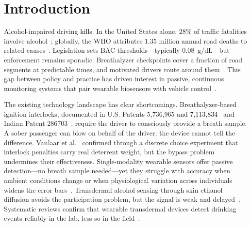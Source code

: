 \documentclass[HARVARD,Times2COL]{WileyNJDv5}
\begin{document}



\maketitle

\renewcommand\thefootnote{}

\renewcommand\thefootnote{\fnsymbol{footnote}}
\setcounter{footnote}{1}

\section{Introduction}\label{sec1}

Alcohol-impaired driving kills. In the United States alone, 28\% of traffic fatalities involve alcohol~\citep{nhtsa2022}; globally, the WHO attributes 1.35 million annual road deaths to related causes~\citep{who2018}. Legislation sets BAC thresholds---typically 0.08~g/dL---but enforcement remains sporadic. Breathalyzer checkpoints cover a fraction of road segments at predictable times, and motivated drivers route around them~\citep{das2023, lombardo2020l}. This gap between policy and practice has driven interest in passive, continuous monitoring systems that pair wearable biosensors with vehicle control~\citep{watchover}.

The existing technology landscape has clear shortcomings. Breathalyzer-based ignition interlocks, documented in U.S. Patents 5,736,965 and 7,113,834~\citep{uspat5736965, uspat7113834} and Indian Patent 286703~\citep{inpat286703}, require the driver to consciously provide a breath sample. A sober passenger can blow on behalf of the driver; the device cannot tell the difference. Vanlaar et al.~\citep{interlock2024} confirmed through a discrete choice experiment that interlock penalties carry real deterrent weight, but the bypass problem undermines their effectiveness. Single-modality wearable sensors offer passive detection---no breath sample needed---yet they struggle with accuracy when ambient conditions change or when physiological variation across individuals widens the error bars~\citep{bush2024development}. Transdermal alcohol sensing through skin ethanol diffusion avoids the participation problem, but the signal is weak and delayed~\citep{fairbairn2021, fairbairn2025}. Systematic reviews confirm that wearable transdermal devices detect drinking events reliably in the lab, less so in the field~\citep{wang2022jmir, tay2023}.
\end{document}
